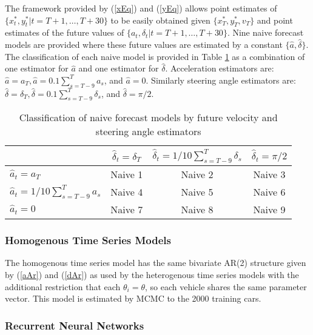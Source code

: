 \documentclass[12pt,a4paper]{article}\usepackage[]{graphicx}\usepackage[]{color}
\begin{document}
The framework provided by (\ref{xEq}) and (\ref{yEq}) allows point estimates of $\{x^*_{t}, y^*_{t} | t = T + 1, \dots, T+30\}$ to be easily obtained given $\{x^*_T, y^*_T, v_T\}$ and point estimates of the future values of $\{a_{t}, \delta_{t} | t = T + 1, \dots, T+30\}$. Nine naive forecast models are provided where these future values are estimated by a constant $\{\hat{a}, \hat{\delta}\}$. The classification of each naive model is provided in Table \ref{tableNaive} as a combination of one estimator for $\hat{a}$ and one estimator for $\hat{\delta}$. Acceleration estimators are: $\hat{a} = a_T, \hat{a} = 0.1 \sum_{s = T-9}^T a_s$, and $\hat{a} = 0$. Similarly steering angle estimators are: $\hat{\delta} = \delta_T, \hat{\delta} = 0.1 \sum_{s = T - 9}^T \delta_s$, and $\hat{\delta} = \pi/2$.
\begin{table}
\begin{center}
\begin{tabular}{|l|c|c|c|}
\hline
& $\hat{\delta}_t = \delta_T$ & $\hat{\delta}_t = 1/10 \sum_{s=T-9}^T \delta_s$ & $\hat{\delta}_t = \pi/2$ \\
\hline
$\hat{a}_t = a_T$ & Naive 1 & Naive 2 & Naive 3 \\
$\hat{a}_t = 1/10\sum_{s=T-9}^T a_s$ & Naive 4 & Naive 5 & Naive 6\\
$\hat{a}_t = 0$ & Naive 7 & Naive 8 & Naive 9 \\
\hline
\end{tabular}
\end{center}
\label{tableNaive}
\caption{Classification of naive forecast models by future velocity and steering angle estimators}
\end{table}

\subsubsection{Homogenous Time Series Models}

The homogenous time series model has the same bivariate AR(2) structure given by (\ref{aAr}) and (\ref{dAr}) as used by the heterogenous time series models with the additional restriction that each $\theta_i = \theta$, so each vehicle shares the same parameter vector. This model is estimated by MCMC to the 2000 training cars.

\subsubsection{Recurrent Neural Networks}
\end{document}
